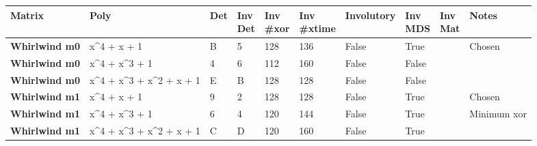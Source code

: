 \begin{footnotesize}
\begin{longtable}{|l|l|l|l|l|l|l|l|l|l|}
\hline
\textbf{Matrix}               & \textbf{Poly}                           & \textbf{Det} & \shortstack{\textbf{Inv} \\ \textbf{Det}} & \shortstack{\textbf{Inv} \\ \textbf{\#xor}} & \shortstack{\textbf{Inv} \\ \textbf{\#xtime}} & \textbf{Involutory} & \shortstack{\textbf{Inv} \\ \textbf{MDS}} & \shortstack{\textbf{Inv} \\ \textbf{Mat}} & \textbf{Notes} \\ \hline
\endfirsthead
%
\endhead
%
\textbf{Whirlwind m0}         & x\textasciicircum{}4 + x + 1                                               & B             & 5                 & 128                 & 136                   & False               & True              &              & Chosen                     \\ \hline
\textbf{Whirlwind m0}         & x\textasciicircum{}4 + x\textasciicircum{}3 + 1                            & 4             & 6                 & 112                 & 160                   & False               & False             &              &                            \\ \hline
\textbf{Whirlwind m0}         & x\textasciicircum{}4 + x\textasciicircum{}3 + x\textasciicircum{}2 + x + 1 & E             & B                 & 128                 & 128                   & False               & False             &              &                            \\ \hline
\textbf{Whirlwind m1}         & x\textasciicircum{}4 + x + 1                                               & 9             & 2                 & 128                 & 128                   & False               & True              &              & Chosen                     \\ \hline
\textbf{Whirlwind m1}         & x\textasciicircum{}4 + x\textasciicircum{}3 + 1                            & 6             & 4                 & 120                 & 144                   & False               & True              &              & Minimum xor                \\ \hline
\textbf{Whirlwind m1}         & x\textasciicircum{}4 + x\textasciicircum{}3 + x\textasciicircum{}2 + x + 1 & C             & D                 & 120                 & 160                   & False               & True              &              &                            \\ \hline

\end{longtable}
\end{footnotesize}
